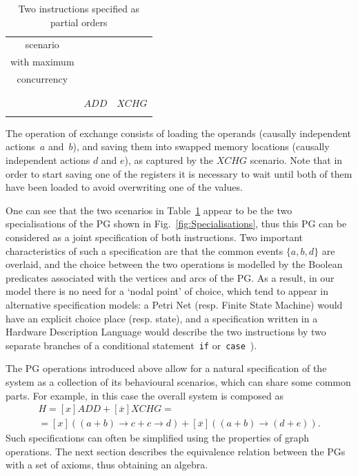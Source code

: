 \begin{table}
\begin{centering}
\begin{tabular}{|c||c||c|c|}
\multicolumn{2}{|c||}{scenario} &  & \tabularnewline
\multicolumn{2}{|c||}{with maximum} &  & \tabularnewline
\multicolumn{2}{|c||}{concurrency} &  & \tabularnewline
\multicolumn{2}{|c||}{} &  & \tabularnewline
\multicolumn{2}{|c||}{} &  & \tabularnewline
\multicolumn{2}{|c||}{} & $\mathit{ADD}$ & $\mathit{XCHG}$\tabularnewline
\multicolumn{2}{|c||}{} &  & \tabularnewline
\hline 
\end{tabular}
\par\end{centering}

\caption{\label{tab-two-operations}Two instructions specified as partial orders}
\end{table}


The operation of exchange consists of loading the operands (causally
independent actions~$a$ and~$b$), and saving them into swapped
memory locations (causally independent actions $d$ and $e$), as
captured by the $\mathit{XCHG}$ scenario. Note that in order to start
saving one of the registers it is necessary to wait until both of
them have been loaded to avoid overwriting one of the values.

One can see that the two scenarios in Table~\ref{tab-two-operations}
appear to be the two specialisations of the PG shown in Fig.~\ref{fig:Specialisations},
thus this PG can be considered as a joint specification of both instructions.
Two important characteristics of such a specification are that the
common events $\{a,b,d\}$ are overlaid, and the choice between the
two operations is modelled by the Boolean predicates associated with
the vertices and arcs of the PG. As a result, in our model there is
no need for a `nodal point' of choice, which tend to appear in alternative
specification models: a Petri Net (resp. Finite State Machine) would
have an explicit choice place (resp. state), and a specification written
in a Hardware Description Language would describe the two instructions
by two separate branches of a conditional statement~\texttt{if} or~\texttt{case}~\cite{1994_de_micheli_book}).

The PG operations introduced above allow for a natural specification
of the system as a collection of its behavioural scenarios, which
can share some common parts. For example, in this case the overall
system is composed as
\begin{equation}
\begin{array}{c}
H=[x]ADD+[\overline{x}]XCHG=\\
=\![x]((a\!+\! b)\!\rightarrow\! c\!+\! c\!\rightarrow\! d)\!+\![\overline{x}]((a\!+\! b)\!\rightarrow\!(d\!+\! e)).
\end{array}\label{eq:H_ADD_XCHG}
\end{equation}
Such specifications can often be simplified using the properties of
graph operations. The next section describes the equivalence relation
between the PGs with a set of axioms, thus obtaining an algebra.


